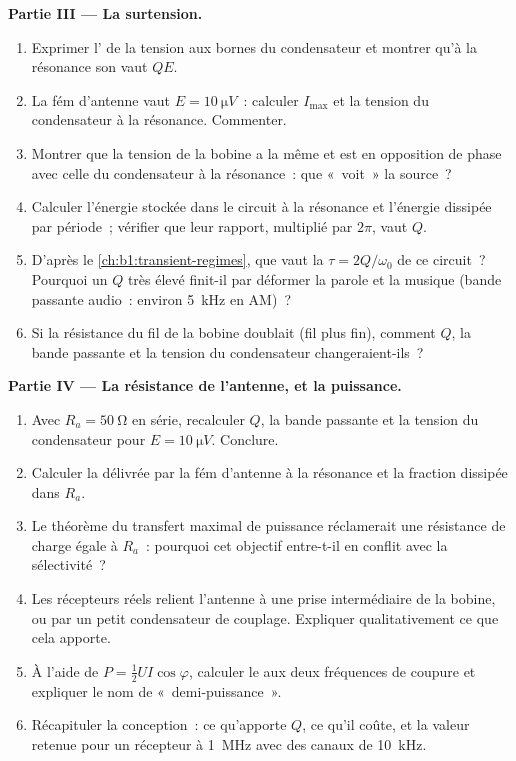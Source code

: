 \begin{problem}
\medskip
\noindent\textbf{Partie III --- La surtension.}
\begin{enumerate}[resume]
  \item Exprimer l' de la tension aux bornes du
        condensateur et montrer qu'à la résonance son  vaut $QE$.
  \item La fém d'antenne vaut $E = \qty{10}{\micro V}$~: calculer
        $I_{\max}$ et la tension du condensateur à la résonance.
        Commenter.
  \item Montrer que la tension de la bobine a la même  et est
        en opposition de phase avec celle du condensateur à la
        résonance~: que «~voit~» la source~?
  \item Calculer l'énergie stockée dans le circuit à la résonance et
        l'énergie dissipée par période~; vérifier que leur rapport,
        multiplié par $2\pi$, vaut $Q$.
  \item D'après le \cref{ch:b1:transient-regimes}, que vaut la  $\tau = 2Q/\omega_0$ de ce circuit~? Pourquoi un $Q$
        très élevé finit-il par déformer la parole et la musique (bande
        passante audio~: environ \qty{5}{kHz} en AM)~?
  \item Si la résistance du fil de la bobine doublait (fil plus fin),
        comment $Q$, la bande passante et la tension du condensateur
        changeraient-ils~?
\end{enumerate}

\medskip
\noindent\textbf{Partie IV --- La résistance de l'antenne, et la puissance.}
\begin{enumerate}[resume]
  \item Avec $R_a = \qty{50}{\ohm}$ en série, recalculer $Q$, la bande
        passante et la tension du condensateur pour
        $E = \qty{10}{\micro V}$. Conclure.
  \item Calculer la  délivrée par la fém d'antenne à la
        résonance et la fraction dissipée dans $R_a$.
  \item Le théorème du transfert maximal de puissance réclamerait une
        résistance de charge égale à $R_a$~: pourquoi cet objectif
        entre-t-il en conflit avec la sélectivité~?
  \item Les récepteurs réels relient l'antenne à une prise intermédiaire
        de la bobine, ou par un petit condensateur de couplage.
        Expliquer qualitativement ce que cela apporte.
  \item À l'aide de $P = \tfrac12 UI\cos\varphi$, calculer le  aux deux fréquences de coupure et expliquer le nom de
        «~demi-puissance~».
  \item Récapituler la conception~: ce qu'apporte $Q$, ce qu'il coûte,
        et la valeur retenue pour un récepteur à \qty{1}{MHz} avec des
        canaux de \qty{10}{kHz}.
\end{enumerate}
\end{problem}

